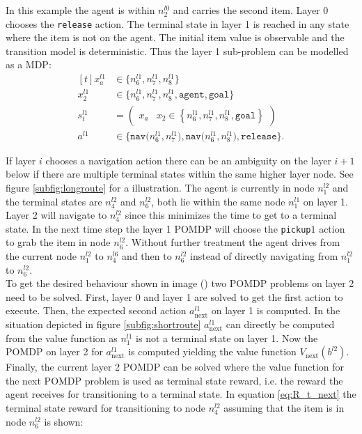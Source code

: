 \begin{example}
In this example the agent is within $n_2^{l0}$ and carries the second item. Layer 0 chooses the \texttt{release} action. The terminal state in layer 1 is reached in any state where the item is not on the agent. The initial item value is observable and the transition model is deterministic. Thus the layer 1 sub-problem can be modelled as a MDP:
\begin{equation}
    \begin{aligned}[t] 
        x_a^{l1} &\in \big\{ n_6^{l1}, n_7^{l1}, n_8^{l1} \big\} \\
        x_2^{l1} &\in  \big\{ n_6^{l1}, n_7^{l1}, n_8^{l1}, \texttt{agent}, \texttt{goal} \big\}\\
        s_t^{l1} &= \begin{pmatrix} x_a & x_2\in\left\{ n_6^{l1}, n_7^{l1}, n_8^{l1}, \texttt{goal} \right\} \end{pmatrix}\\
        a^{l1} &\in \big\{\texttt{nav($n_6^{l1}, n_7^{l1}$)}, \texttt{nav($n_6^{l1}, n_8^{l1}$)}, \texttt{release} \big\}.
        \end{aligned}
\end{equation}
\demo
\end{example}
%
If layer $i$ chooses a navigation action there can be an ambiguity on the layer $i+1$ below if there are multiple terminal states within the same higher layer node. See figure \ref{subfig:longroute} for a illustration. The agent is currently in node $n_1^{l2}$ and the terminal states are $n_4^{l2}$ and $n_6^{l2}$, both lie within the same node $n_1^{l1}$ on layer 1. Layer 2 will navigate to $n_4^{l2}$ since this minimizes the time to get to a terminal state. In the next time step the layer 1 POMDP will choose the \texttt{pickup}$1$ action to grab the item in node $n_6^{l2}$. Without further treatment the agent drives from the current node $n_1^{l2}$ to $n_4^{l6}$ and then to $n_6^{l2}$ instead of directly navigating from $n_1^{l2}$ to $n_6^{l2}$. \\
To get the desired behaviour shown in image () two POMDP problems on layer 2 need to be solved. First, layer 0 and layer 1 are solved to get the first action to execute. Then, the expected second action $a_\text{next}^{l1}$ on layer 1 is computed. In the situation depicted in figure \ref{subfig:shortroute} $a_\text{next}^{l1}$ can directly be computed from the value function as $n_1^{l1}$ is not a terminal state on layer 1. Now the  POMDP on layer 2 for $a_\text{next}^{l1}$ is computed yielding the value function $V_\text{next}(b^{l2})$. Finally, the current layer 2 POMDP can be solved where the value function for the next POMDP problem is used as terminal state reward, i.e. the reward the agent receives for transitioning to a terminal state. In equation \ref{eq:R_t_next} the terminal state reward for transitioning to node $n_4^{l2}$ assuming that the item is in node $n_6^{l2}$ is shown:
